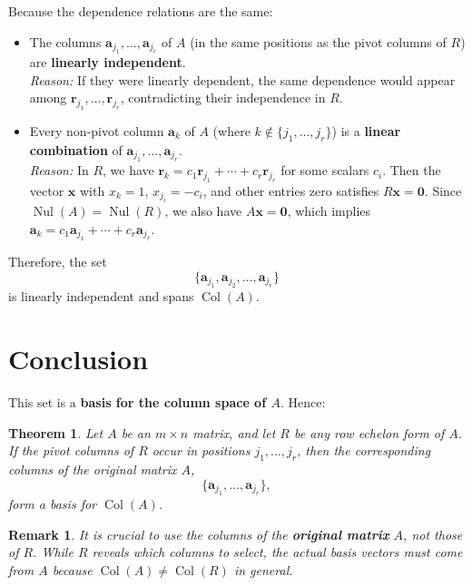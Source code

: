 \documentclass{article}
\newtheorem{theorem}{Theorem}
\newtheorem{remark}{Remark}
\begin{document}
Because the dependence relations are the same:
\begin{itemize}
\item The columns $\mathbf{a}_{j_1}, \dots, \mathbf{a}_{j_r}$ of $A$ (in the same positions as the pivot columns of $R$) are \textbf{linearly independent}. \\
    \textit{Reason:} If they were linearly dependent, the same dependence would appear among $\mathbf{r}_{j_1}, \dots, \mathbf{r}_{j_r}$, contradicting their independence in $R$.

    \item Every non-pivot column $\mathbf{a}_k$ of $A$ (where $k \notin \{j_1,\dots,j_r\}$) is a \textbf{linear combination} of $\mathbf{a}_{j_1}, \dots, \mathbf{a}_{j_r}$. \\
    \textit{Reason:} In $R$, we have $\mathbf{r}_k = c_1 \mathbf{r}_{j_1} + \cdots + c_r \mathbf{r}_{j_r}$ for some scalars $c_i$. Then the vector $\mathbf{x}$ with $x_k = 1$, $x_{j_i} = -c_i$, and other entries zero satisfies $R\mathbf{x} = \mathbf{0}$. Since $\operatorname{Nul}(A) = \operatorname{Nul}(R)$, we also have $A\mathbf{x} = \mathbf{0}$, which implies $\mathbf{a}_k = c_1 \mathbf{a}_{j_1} + \cdots + c_r \mathbf{a}_{j_r}$.
\end{itemize}


Therefore, the set
\[
\{ \mathbf{a}_{j_1}, \mathbf{a}_{j_2}, \dots, \mathbf{a}_{j_r} \}
\]
is linearly independent and spans $\operatorname{Col}(A)$.

\section*{ Conclusion}

This set is a \textbf{basis for the column space of $A$}. Hence:

\begin{theorem}
Let $A$ be an $m \times n$ matrix, and let $R$ be any row echelon form of $A$. If the pivot columns of $R$ occur in positions $j_1, \dots, j_r$, then the corresponding columns of the original matrix $A$,
\[
\{ \mathbf{a}_{j_1}, \dots, \mathbf{a}_{j_r} \},
\]
form a basis for $\operatorname{Col}(A)$.
\end{theorem}

\begin{remark}
It is crucial to use the columns of the \textbf{original matrix} $A$, not those of $R$. While $R$ reveals \textit{which} columns to select, the actual basis vectors must come from $A$ because $\operatorname{Col}(A) \ne \operatorname{Col}(R)$ in general.
\end{remark}
\end{document}
